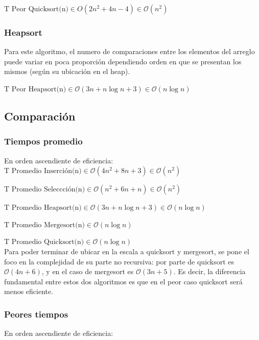\documentclass[article,a4paper]{article}
\begin{document}
$\mbox{T Peor Quicksort(n)} \in O(2 n ^2 + 4n - 4) \in \mathcal O(n^2)$

\subsubsection{Heapsort}

Para este algoritmo, el numero de comparaciones entre los elementos del arreglo puede variar en poca proporción dependiendo orden en que se presentan los mismos (según su ubicación en el heap).

$\mbox{T Peor Heapsort(n)} \in \mathcal O(3n + n \log n + 3) \in \mathcal O(n \log n)$

\subsection{Comparación}

\subsubsection{Tiempos promedio}

En orden ascendiente de eficiencia:\\

$\mbox{T Promedio Inserción(n)} \in \mathcal O(4n^2 + 8n + 3) \in \mathcal O(n^2)$

$\mbox{T Promedio Seleccción(n)} \in \mathcal O(n^2 + 6n + n) \in \mathcal O(n^2)$

$\mbox{T Promedio Heapsort(n)} \in \mathcal O(3n + n \log n + 3) \in \mathcal O(n \log n)$ 

$\mbox{T Promedio Mergesort(n)} \in \mathcal O(n \log n)$ 

$\mbox{T Promedio Quicksort(n)} \in \mathcal O(n \log n)$\\

Para poder terminar de ubicar en la escala a quicksort y mergesort, se pone el foco en la complejidad de su parte no recursiva: por parte de quicksort es $\mathcal O(4n + 6)$, y en el caso de mergesort es $\mathcal O(3n + 5)$. Es decir, la diferencia fundamental entre estos dos algoritmos es que en el peor caso quicksort será menos eficiente.

\subsubsection{Peores tiempos}

En orden ascendiente de eficiencia:\\
\end{document}

